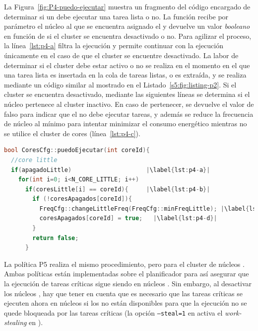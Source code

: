 La Figura~\ref{fig:P4-puedo-ejecutar} muestra un fragmento del código
encargado de determinar si un \wt debe ejecutar una tarea lista o no. La
función recibe por parámetro el núcleo al que se encuentra asignado el \wt
y devuelve un valor \emph{booleano} en función de si el cluster se
encuentra desactivado o no. Para agilizar el proceso, la
línea~\ref{lst:p4-a} filtra la ejecución y permite continuar con la
ejecución únicamente en el caso de que el cluster se encuentre
desactivado. La labor de determinar si el cluster debe estar activo o no se
realiza en el momento en el que una tarea lista es insertada en la cola de
tareas listas, o es extraída, y se realiza mediante un código similar
al mostrado en el Listado~\ref{s5:fig:listing-p2}. Si el cluster se encuentra
desactivado, mediante las siguientes líneas se determina si el núcleo
pertenece al cluster inactivo. En caso de pertenecer, se devuelve el
valor de falso para indicar que el \wt no debe ejecutar tareas, y además
se reduce la frecuencia de núcleo al mínimo para intentar minimizar el
consumo energético mientras no se utilice el cluster de cores \LITTLE
(línea~\ref{lst:p4-c}).


\begin{lstlisting}[float,language=C++,caption={Fragmento de código para determinar si asignar una tarea a un
    \wt o no.},label={fig:P4-puedo-ejecutar}]
bool CoresCfg::puedoEjecutar(int coreId){
  //core little
  if(apagadoLittle)                     |\label{lst:p4-a}|
    for(int i=0; i<N_CORE_LITTLE; i++)
      if(coresLittle[i] == coreId){     |\label{lst:p4-b}|
        if (!coresApagados[coreId]){
          FreqCfg::changeLittleFreq(FreqCfg::minFreqLittle); |\label{lst:p4-c}|
          coresApagados[coreId] = true;   |\label{lst:p4-d}|
        }
        return false;
      }
\end{lstlisting}


La política P5 realiza el mismo procedimiento, pero para el cluster de
núcleos \BIG. Ambas políticas están implementadas sobre el planificador
\botlev para así asegurar que la ejecución de tareas críticas sigue siendo
en núcleos \BIG. Sin embargo, al desactivar los núcleos \BIG, hay que tener
en cuenta que es necesario que las tareas críticas se ejecuten ahora en
núcleos \LITTLE si los \BIG no están disponibles para que la ejecución no
se quede bloqueada por las tareas críticas (la opción \texttt{--steal=1} en
\botlev activa el {\em work-stealing} en \nanos).

